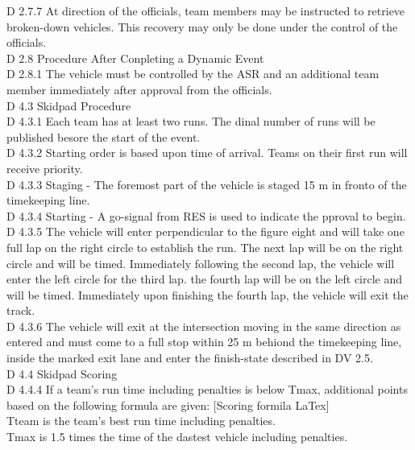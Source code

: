 \documentclass{article}
\begin{document}
D 2.7.7 At direction of the officials, team members may be instructed to retrieve broken-down vehicles. This recovery may only be done under the control of the officials.\\

D 2.8 Procedure After Conpleting a Dynamic Event\\

D 2.8.1 The vehicle must be controlled by the ASR and an additional team member immediately after approval from the officials.\\

D 4.3 Skidpad Procedure\\

D 4.3.1 Each team has at least two runs. The dinal number of runs will be published besore the start of the event.\\

D 4.3.2 Starting order is based upon time of arrival. Teams on their first run will receive priority.\\

D 4.3.3 Staging - The foremost part of the vehicle is staged 15 m in fronto of the timekeeping line.\\

D 4.3.4 Starting - A go-signal from RES is used to indicate the pproval to begin.\\

D 4.3.5 The vehicle will enter perpendicular to the figure eight and will take one full lap on the right circle to establish the run. The next lap will be on the right circle and will be timed. Immediately following the second lap, the vehicle will enter the left circle for the third lap. the fourth lap will be on the left circle and will be timed. Immediately upon finishing the fourth lap, the vehicle will exit the track.\\

D 4.3.6 The vehicle will exit at the intersection moving in the same direction as entered and must come to a full stop within 25 m behiond the timekeeping line, inside the marked exit lane and enter the finish-state described in DV 2.5.\\

D 4.4 Skidpad Scoring\\

D 4.4.4 If a team's run time including penalties is below Tmax, additional points based on the following formula are given: [Scoring formila LaTex]\\
	Tteam is the team's best run time including penalties.\\
	Tmax is 1.5 times the time of the dastest vehicle including penalties.\\
	
\end{document}
